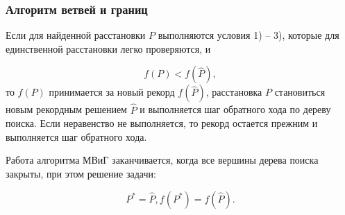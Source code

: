 \begin{frame}
    \fontsize{8pt}{7.2}\selectfont
    \frametitle{Алгоритм ветвей и границ}
    \justifying
    Если для найденной расстановки $P$ выполняются условия 1) – 3), которые для единственной расстановки легко проверяются, и

    \begin{displaymath}
        f(P) < f(\widehat{P}),
    \end{displaymath}
    то $f(P)$ принимается за новый рекорд $f(\widehat{P})$, расстановка $P$ становиться новым рекордным решением $\widehat{P}$ и выполняется шаг обратного хода по дереву поиска. Если неравенство не выполняется, то рекорд остается прежним и выполняется шаг обратного хода.

    \bigskip
    Работа алгоритма МВиГ заканчивается, когда все вершины дерева поиска закрыты, при этом решение задачи: 

    \begin{displaymath}
        P^{*} = \widehat{P},  f(P^*) = f(\widehat{P}).
    \end{displaymath}

    \bigskip
    \bigskip
\end{frame}

